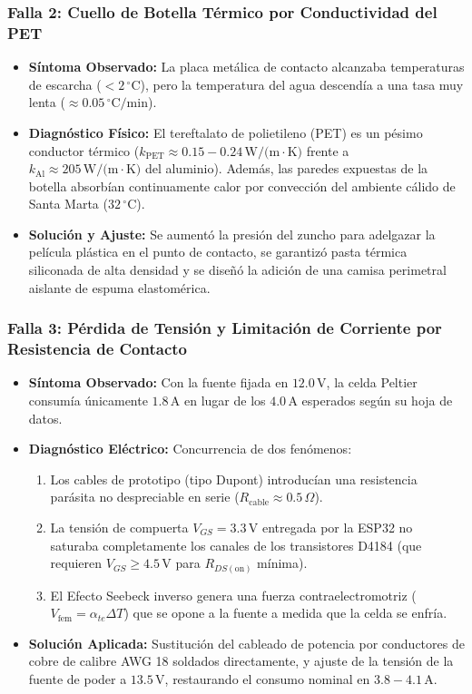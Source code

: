 \subsubsection{Falla 2: Cuello de Botella Térmico por Conductividad del PET}
\begin{itemize}
    \item \textbf{Síntoma Observado:} La placa metálica de contacto alcanzaba temperaturas de escarcha ($< 2\,^\circ\text{C}$), pero la temperatura del agua descendía a una tasa muy lenta ($\approx 0.05\,^\circ\text{C/min}$).
    \item \textbf{Diagnóstico Físico:} El tereftalato de polietileno (PET) es un pésimo conductor térmico ($k_{\text{PET}} \approx 0.15 - 0.24\,\text{W/(m}\cdot\text{K)}$ frente a $k_{\text{Al}} \approx 205\,\text{W/(m}\cdot\text{K)}$ del aluminio). Además, las paredes expuestas de la botella absorbían continuamente calor por convección del ambiente cálido de Santa Marta ($32\,^\circ\text{C}$).
    \item \textbf{Solución y Ajuste:} Se aumentó la presión del zuncho para adelgazar la película plástica en el punto de contacto, se garantizó pasta térmica siliconada de alta densidad y se diseñó la adición de una camisa perimetral aislante de espuma elastomérica.
\end{itemize}

\subsubsection{Falla 3: Pérdida de Tensión y Limitación de Corriente por Resistencia de Contacto}
\begin{itemize}
    \item \textbf{Síntoma Observado:} Con la fuente fijada en $12.0\,\text{V}$, la celda Peltier consumía únicamente $1.8\,\text{A}$ en lugar de los $4.0\,\text{A}$ esperados según su hoja de datos.
    \item \textbf{Diagnóstico Eléctrico:} Concurrencia de dos fenómenos:
    \begin{enumerate}
        \item Los cables de prototipo (tipo Dupont) introducían una resistencia parásita no despreciable en serie ($R_{\text{cable}} \approx 0.5\,\Omega$).
        \item La tensión de compuerta $V_{GS} = 3.3\,\text{V}$ entregada por la ESP32 no saturaba completamente los canales de los transistores D4184 (que requieren $V_{GS} \ge 4.5\,\text{V}$ para $R_{DS(\text{on})}$ mínima).
        \item El Efecto Seebeck inverso genera una fuerza contraelectromotriz ($V_{\text{fem}} = \alpha_{te} \Delta T$) que se opone a la fuente a medida que la celda se enfría.
    \end{enumerate}
    \item \textbf{Solución Aplicada:} Sustitución del cableado de potencia por conductores de cobre de calibre AWG 18 soldados directamente, y ajuste de la tensión de la fuente de poder a $13.5\,\text{V}$, restaurando el consumo nominal en $3.8 - 4.1\,\text{A}$.
\end{itemize}

